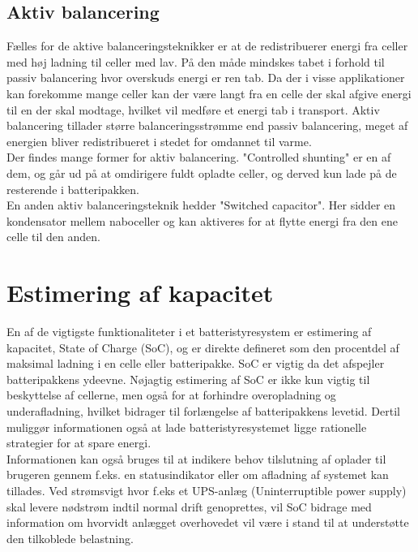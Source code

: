 \subsection{Aktiv balancering}
Fælles for de aktive balanceringsteknikker er at de redistribuerer energi fra celler med høj ladning til celler med lav. På den måde mindskes tabet i forhold til passiv balancering hvor overskuds energi er ren tab. Da der i visse applikationer kan forekomme mange celler kan der være langt fra en celle der skal afgive energi til en der skal modtage, hvilket vil medføre et energi tab i transport. Aktiv balancering tillader større balanceringsstrømme end passiv balancering, meget af energien bliver redistribueret i stedet for omdannet til varme.
\\

Der findes mange former for aktiv balancering. "Controlled shunting" er en af dem, og går ud på at omdirigere fuldt opladte celler, og derved kun lade på de resterende i batteripakken.
\\

En anden aktiv balanceringsteknik hedder "Switched capacitor". Her sidder en kondensator mellem naboceller og kan aktiveres for at flytte energi fra den ene celle til den anden.

\section{Estimering af kapacitet}\label{afs:estimering_kapacitet}
En af de vigtigste funktionaliteter i et batteristyresystem er estimering af kapacitet, State of Charge (SoC), og er direkte defineret som den procentdel af maksimal ladning i en celle eller batteripakke. SoC er vigtig da det afspejler batteripakkens ydeevne. Nøjagtig estimering af SoC er ikke kun vigtig til beskyttelse af cellerne, men også for at forhindre overopladning og underafladning, hvilket bidrager til forlængelse af batteripakkens levetid. Dertil muliggør informationen også at lade batteristyresystemet ligge rationelle strategier for at spare energi. \\

Informationen kan også bruges til at indikere behov tilslutning af oplader til brugeren gennem f.eks. en statusindikator eller om afladning af systemet kan tillades. 
Ved strømsvigt hvor f.eks et UPS-anlæg (Uninterruptible power supply) skal levere nødstrøm indtil normal drift genoprettes, vil SoC bidrage med information om hvorvidt anlægget overhovedet vil være i stand til at understøtte den tilkoblede belastning. \\

